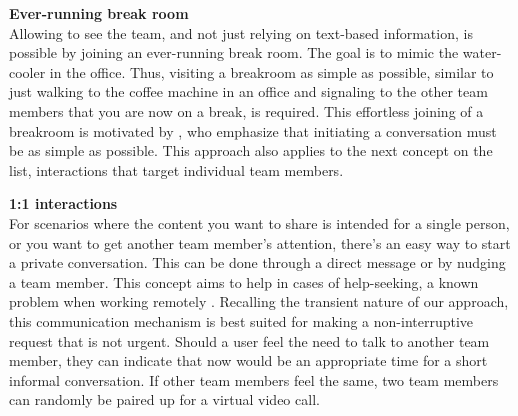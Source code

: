 \medskip\noindent\textbf{Ever-running break room} \\
Allowing to see the team, and not just relying on text-based information, is possible by joining an ever-running break room. The goal is to mimic the water-cooler in the office. Thus, visiting a breakroom as simple as possible, similar to just walking to the coffee machine in an office and signaling to the other team members that you are now on a break, is required. This effortless joining of a breakroom is motivated by \textcite{chang2007out}, who emphasize that initiating a conversation must be as simple as possible. This approach also applies to the next concept on the list, interactions that target individual team members.

\medskip\noindent\textbf{1:1 interactions} \\
For scenarios where the content you want to share is intended for a single person, or you want to get another team member's attention, there's an easy way to start a private conversation. This can be done through a direct message or by nudging a team member. This concept aims to help in cases of help-seeking, a known problem when working remotely \autocite{herbsleb2003empirical}. Recalling the transient nature of our approach, this communication mechanism is best suited for making a non-interruptive request that is not urgent. Should a user feel the need to talk to another team member, they can indicate that now would be an appropriate time for a short informal conversation. If other team members feel the same, two team members can randomly be paired up for a virtual video call.
